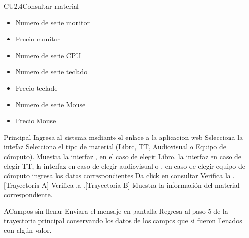 \begin{UseCase}{CU2.4}{Consultar material}
{\begin{itemize}
			\item Numero de serie monitor 
			\item Precio monitor
			\item Numero de serie CPU
			\item Numero de serie teclado
			\item Precio teclado
			\item Numero de serie Mouse
			\item Precio Mouse						
	
		\end{itemize}				
		}

	\end{UseCase}
	\begin{UCtrayectoria}{Principal}
	\UCpaso[\UCactor] Ingresa al sistema mediante el enlace a la aplicacion web
	 \UCpaso[\UCactor] Selecciona la intefaz 
	  \UCpaso[\UCactor] Selecciona el tipo de material (Libro, TT, Audiovisual o Equipo de cómputo).
	 \UCpaso[\UCsist]Muestra la interfaz , en el caso de elegir Libro, la interfaz  en caso de elegir TT, la interfaz  en caso de elegir audiovisual o , en caso de elegir equipo de cómputo
	  \UCpaso[\UCactor] ingresa los datos correspondientes
	  \UCpaso[\UCactor] Da click en consultar
	   \UCpaso[\UCsist] Verifica la  .[Trayectoria A]
	    \UCpaso[\UCsist] Verifica la .[Trayectoria B]
	    \UCpaso[\UCsist] Muestra la información del material correspondiente.


	\end{UCtrayectoria}
		\begin{UCtrayectoriaA}{A}{Campos sin llenar}
			\UCpaso[\UCsist] Enviara el  mensaje en pantalla 
			\UCpaso[\UCsist] Regresa al paso 5 de la trayectoria principal conservando los datos de los campos que si fueron llenados con algún valor.
		\end{UCtrayectoriaA}
		
